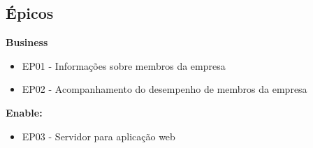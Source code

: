 \subsection{Épicos}
\label{epicos}
\textbf{Business}
\begin{itemize}
\item {EP01 - Informações sobre membros da empresa}
\item {EP02 - Acompanhamento do desempenho de membros da empresa}
\end{itemize}

\textbf{Enable:}
\begin{itemize}
\item {EP03 - Servidor para aplicação web}
\end{itemize}
